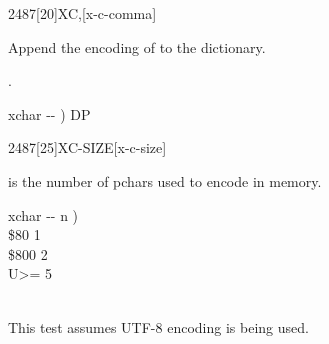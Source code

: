 \begin{worddef}{2487}[20]{XC,}[x-c-comma]
\item {}

	Append the encoding of  to the dictionary.

\see {}.

	\begin{implement}
	\word{:}   xchar -{}- )   DP \word{!} \word{;}
	\end{implement}
\end{worddef}


\begin{worddef}{2487}[25]{XC-SIZE}[x-c-size]
\item {}

	 is the number of pchars used to encode  in memory.

	\begin{implement}
	\word{:}   xchar -{}- n ) \\
	\tab {} \$80    1     \\
	\tab \$800  2  \\
	\tab {}  U>=   5         \\
	\tab {}  \\
	\word{;}
	\end{implement}

	\begin{testing}
		This test assumes UTF-8 encoding is being used.

		\ttfamily
		 \\
		 \\
		 \\
		 \\
		 \\
		 \\
		 \\
		 \\
  \end{testing}
\end{worddef}



